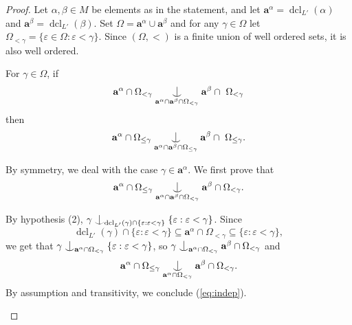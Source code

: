 \documentclass[10pt,a4paper]{amsart}
\DeclareMathOperator{\dcl}{dcl}
\newcommand{\forkindep}[1][]{%
  \mathrel{
    \mathop{
      \vcenter{
        \hbox{\oalign{\noalign{\kern-.3ex}\hfil$\vert$\hfil\cr
              \noalign{\kern-.7ex}
              $\smile$\cr\noalign{\kern-.3ex}}}
      }
    }\displaylimits_{#1}
  }
}
\begin{document}
\begin{proof}
Let $\alpha,\beta\in M$ be elements as in the statement, and let $\mathbf{a}^\alpha=\dcl_{L'}(\alpha)$ and $\mathbf{a}^\beta=\dcl_{L'}(\beta)$.
Set $\Omega=\mathbf{a}^\alpha\cup\mathbf{a}^\beta$ and for any $\gamma\in \Omega$ let $\Omega_{<\gamma}=\{\varepsilon \in \Omega: \varepsilon<\gamma\}$. Since $(\Omega,<)$ is a finite union of well ordered sets, it is also well ordered. 

\begin{claim}\label{C:induction}
For $\gamma\in \Omega$, if \[\mathbf{a}^\alpha\cap \Omega_{<\gamma} \forkindep[\mathbf{a}^\alpha\cap \mathbf{a}^\beta\cap \Omega_{<\gamma}]\mathbf{a}^\beta\cap\ \Omega_{<\gamma}\]
then
\[\mathbf{a}^\alpha\cap \Omega_{\leq \gamma} \forkindep[\mathbf{a}^\alpha\cap \mathbf{a}^\beta\cap \Omega_{\leq \gamma}]\mathbf{a}^\beta\cap\ \Omega_{\leq \gamma}.\]
\end{claim}
\begin{claimproof}
By symmetry, we deal with the case $\gamma\in \mathbf{a}^\alpha$. We first prove that
\begin{equation}\label{eq:indep}
\mathbf{a}^\alpha\cap \Omega_{\leq \gamma}\forkindep[\mathbf{a}^\alpha\cap \mathbf{a}^\beta\cap \Omega_{<\gamma}] \mathbf{a}^\beta\cap \Omega_{<\gamma}.
\end{equation}

By hypothesis (2), $\gamma\forkindep[\dcl_{L'}(\gamma)\cap \{\varepsilon:\varepsilon<\gamma\}]\{\varepsilon:\varepsilon<\gamma\}$.
Since \[\dcl_{L'}(\gamma)\cap\{\varepsilon:\varepsilon<\gamma\}\subseteq \mathbf{a}^\alpha\cap \Omega_{<\gamma}\subseteq \{\varepsilon:\varepsilon<\gamma\},\] we get that $\gamma\forkindep[\mathbf{a}^\alpha\cap \Omega_{<\gamma}]\{\varepsilon:\varepsilon<\gamma\}$, so $\gamma\forkindep[\mathbf{a}^\alpha\cap \Omega_{<\gamma}] \mathbf{a}^\beta\cap \Omega_{<\gamma}$ and \[\mathbf{a}^\alpha\cap\Omega_{\leq \gamma}\forkindep[\mathbf{a}^\alpha\cap \Omega_{<\gamma}] \mathbf{a}^\beta\cap \Omega_{<\gamma}.\] By assumption and transitivity, we conclude (\ref{eq:indep}).


\end{claimproof}
\end{proof}
\end{document}
